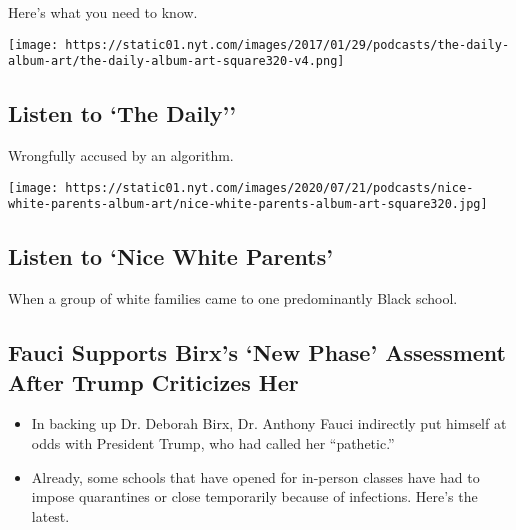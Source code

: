 Here's what you need to know.

\href{/2020/08/03/podcasts/the-daily/algorithmic-justice-racism.html}{}

\texttt{[image: https://static01.nyt.com/images/2017/01/29/podcasts/the-daily-album-art/the-daily-album-art-square320-v4.png]}

\href{/2020/08/03/podcasts/the-daily/algorithmic-justice-racism.html}{}

\hypertarget{listen-to-the-daily}{%
\subsection{Listen to `The Daily''}\label{listen-to-the-daily}}

Wrongfully accused by an algorithm.

\href{/2020/07/30/podcasts/nice-white-parents-serial.html}{}

\texttt{[image: https://static01.nyt.com/images/2020/07/21/podcasts/nice-white-parents-album-art/nice-white-parents-album-art-square320.jpg]}

\href{/2020/07/30/podcasts/nice-white-parents-serial.html}{}

\hypertarget{listen-to-nice-white-parents}{%
\subsection{Listen to `Nice White
Parents'}\label{listen-to-nice-white-parents}}

When a group of white families came to one predominantly Black school.

\href{/2020/08/03/world/coronavirus-covid-19.html}{}

\hypertarget{fauci-supports-birxs-new-phase-assessment-after-trump-criticizes-her}{%
\subsection{Fauci Supports Birx's `New Phase' Assessment After Trump
Criticizes
Her}\label{fauci-supports-birxs-new-phase-assessment-after-trump-criticizes-her}}

\begin{itemize}
\tightlist
\item
  In backing up Dr. Deborah Birx, Dr. Anthony Fauci indirectly put
  himself at odds with President Trump, who had called her ``pathetic.''
\item
  Already, some schools that have opened for in-person classes have had
  to impose quarantines or close temporarily because of infections.
  Here's the latest.
\end{itemize}

